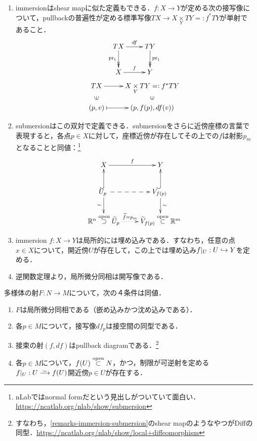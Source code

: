 \documentclass[uplatex,dvipdfmx]{jsreport}
\begin{document}
\begin{remarks}\mbox{}\label{remarks-immersion-submersion}
    \begin{enumerate}
        \item immersionはshear mapに似た定義もできる．$f:X\to Y$が定める次の接写像について，pullbackの普遍性が定める標準写像$TX\to X\underset{Y}{\times}TY=:f^*TY$が単射であること．
        \[\xymatrix{
            TX\ar@{->>}[d]_-{\pr_1}\ar[r]^-{df}&TY\ar@{->>}[d]^-{\pr_1}\\
            X\ar[r]^-f&Y
        }\]
        \[\xymatrix@R-2pc{
            TX\ar[r]&X\underset{Y}{\times}TY=:f^*TY\\
            \rotatebox[origin=c]{90}{$\in$}&\rotatebox[origin=c]{90}{$\in$}\\
            (p,v)\ar@{|->}[r]&(p,f(p),df(v))
        }\]
        \item submersionはこの双対で定義できる．submersionをさらに近傍座標の言葉で表現すると，各点$p\in X$に対して，座標近傍が存在してその上での$f$は射影$p_m$となることと同値：\footnote{nLabではnormal formだという見出しがついていて面白い．\url{https://ncatlab.org/nlab/show/submersion}}
        \[\xymatrix{
            X\ar[r]^-f&Y\\
            U_p\ar@{-->}[r]\ar[d]_-{\sim} \;\ar@{^{(}->}[u]&V_{f(p)} \;\ar@{^{(}->}[u]\ar[d]^-{\sim}\\
            \R^n\osup\wt{U}_p\ar@{.>}[r]^-{\wt{f}=p_m}&\wt{V}_{f(p)}\osub\R^m
        }\]
        \item immersion $f:X\to Y$は局所的には埋め込みである．すなわち，任意の点$x\in X$について，開近傍$U$が存在して，この上では埋め込み$f|_U:U\hookrightarrow Y$を定める．
        \item 逆関数定理より，局所微分同相は開写像である．
    \end{enumerate}
\end{remarks}

\begin{lemma}[局所微分同相の特徴付け]
    多様体の射$F:N\to M$について，次の４条件は同値．
    \begin{enumerate}
        \item $F$は局所微分同相である（嵌め込みかつ沈め込みである）．
        \item 各$p\in M$について，接写像$df_p$は接空間の同型である．
        \item 接束の射$(f,df)$はpullback diagramである．\footnote{すなわち，\ref{remarks-immersion-submersion}のshear mapのようなやつがDiffの同型．\url{https://ncatlab.org/nlab/show/local+diffeomorphism}}
        \item 各$p\in M$について，$f(U)\overset{\mathrm{open}}{\subset} N$，かつ，制限が可逆射を定める$f|_U:U\iso f(U)$開近傍$p\in U$が存在する．
    \end{enumerate}
\end{lemma}
\end{document}
